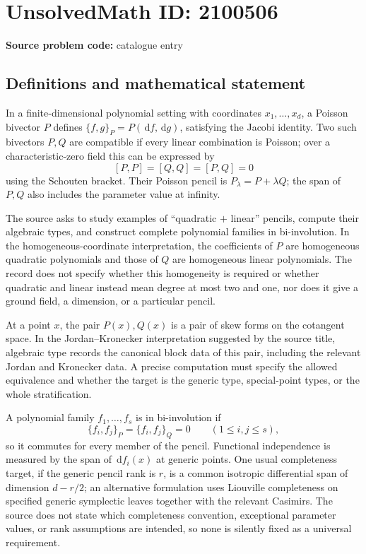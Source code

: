 \documentclass[11pt]{article}
\newcommand{\dd}{\,\mathrm{d}}
\begin{document}
\section*{UnsolvedMath ID: 2100506}
\textbf{Source problem code:} catalogue entry
\subsection{Definitions and mathematical statement}
In a finite-dimensional polynomial setting with coordinates $x_1,\ldots,x_d$, a Poisson bivector $P$ defines $\{f,g\}_P=P(\dd f,\dd g)$, satisfying the Jacobi identity. Two such bivectors $P,Q$ are compatible if every linear combination is Poisson; over a characteristic-zero field this can be expressed by
\[
[P,P]=[Q,Q]=[P,Q]=0
\]
using the Schouten bracket. Their Poisson pencil is $P_\lambda=P+\lambda Q$; the span of $P,Q$ also includes the parameter value at infinity.

The source asks to study examples of ``quadratic $+$ linear'' pencils, compute their algebraic types, and construct complete polynomial families in bi-involution. In the homogeneous-coordinate interpretation, the coefficients of $P$ are homogeneous quadratic polynomials and those of $Q$ are homogeneous linear polynomials. The record does not specify whether this homogeneity is required or whether quadratic and linear instead mean degree at most two and one, nor does it give a ground field, a dimension, or a particular pencil.

At a point $x$, the pair $P(x),Q(x)$ is a pair of skew forms on the cotangent space. In the Jordan--Kronecker interpretation suggested by the source title, algebraic type records the canonical block data of this pair, including the relevant Jordan and Kronecker data. A precise computation must specify the allowed equivalence and whether the target is the generic type, special-point types, or the whole stratification.

A polynomial family $f_1,\ldots,f_s$ is in bi-involution if
\[
\{f_i,f_j\}_P=\{f_i,f_j\}_Q=0\qquad(1\le i,j\le s),
\]
so it commutes for every member of the pencil. Functional independence is measured by the span of $\dd f_i(x)$ at generic points. One usual completeness target, if the generic pencil rank is $r$, is a common isotropic differential span of dimension $d-r/2$; an alternative formulation uses Liouville completeness on specified generic symplectic leaves together with the relevant Casimirs. The source does not state which completeness convention, exceptional parameter values, or rank assumptions are intended, so none is silently fixed as a universal requirement.
\end{document}
